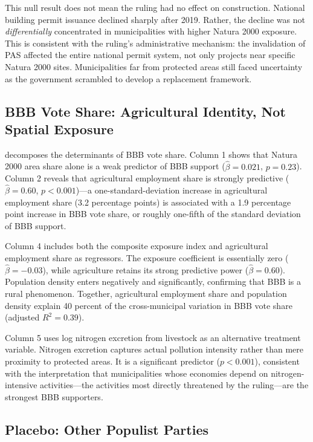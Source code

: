 \documentclass[12pt]{article}
\begin{document}
This null result does not mean the ruling had no effect on construction. National building permit issuance declined sharply after 2019. Rather, the decline was not \textit{differentially} concentrated in municipalities with higher Natura 2000 exposure. This is consistent with the ruling's administrative mechanism: the invalidation of PAS affected the entire national permit system, not only projects near specific Natura 2000 sites. Municipalities far from protected areas still faced uncertainty as the government scrambled to develop a replacement framework.

\subsection{BBB Vote Share: Agricultural Identity, Not Spatial Exposure}



 decomposes the determinants of BBB vote share. Column 1 shows that Natura 2000 area share alone is a weak predictor of BBB support ($\hat{\beta} = 0.021$, $p = 0.23$). Column 2 reveals that agricultural employment share is strongly predictive ($\hat{\beta} = 0.60$, $p < 0.001$)---a one-standard-deviation increase in agricultural employment share (3.2 percentage points) is associated with a 1.9 percentage point increase in BBB vote share, or roughly one-fifth of the standard deviation of BBB support.

Column 4 includes both the composite exposure index and agricultural employment share as regressors. The exposure coefficient is essentially zero ($\hat{\beta} = -0.03$), while agriculture retains its strong predictive power ($\hat{\beta} = 0.60$). Population density enters negatively and significantly, confirming that BBB is a rural phenomenon. Together, agricultural employment share and population density explain 40 percent of the cross-municipal variation in BBB vote share (adjusted $R^2 = 0.39$).

Column 5 uses log nitrogen excretion from livestock as an alternative treatment variable. Nitrogen excretion captures actual pollution intensity rather than mere proximity to protected areas. It is a significant predictor ($p < 0.001$), consistent with the interpretation that municipalities whose economies depend on nitrogen-intensive activities---the activities most directly threatened by the ruling---are the strongest BBB supporters.

\subsection{Placebo: Other Populist Parties}
\end{document}
